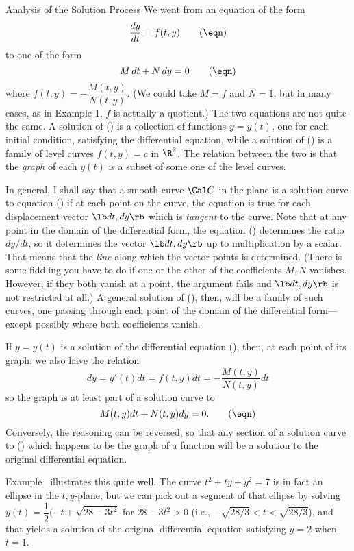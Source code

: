 \subhead Analysis of the Solution Process \endsubhead
We went from an equation of the form
\nexteqn
\xdef\EqA{\eqn}
$$
\frac{dy}{dt} = f(t,y)\tag\eqn
$$
to one of the form
\nexteqn
$$
M\,dt + N\,dy = 0\tag\eqn
$$
where $f(t,y) = -\dfrac{M(t,y)}{N(t,y)}$.  (We could take $M = f$
and $N = 1$, but in many cases, as in Example 1, $f$ is actually
a quotient.)  
The two equations are not quite the same.  A solution of (\EqA)
is a collection of functions $y = y(t)$,
one for each initial condition,  satisfying the differential equation,
while a solution of (\eqn) is a family of level curves
$f(t,y) = c$ in $\R^2$.  The relation between the two is
that the {\it graph\/} of each $y(t)$ is a subset of
some one of the level curves.

In general, I shall say that a smooth curve $\Cal C$
 in the plane is a
solution curve to equation (\eqn) if at each point on the
curve, the equation is true for each displacement vector
$\lb dt, dy \rb$ which is {\it tangent\/} to the curve.  Note that at
 any point in the domain of the differential form, the equation
(\eqn) determines the ratio $dy/dt$, so it
determines the vector  $\lb dt, dy \rb$
 up to multiplication by a scalar.  That means that the
{\it line\/} along which the vector  points is determined.  
(There is some fiddling you
have to do if one or the other of the coefficients $M, N$
vanishes.  However, if they both vanish at a point, the argument
fails and $\lb dt, dy \rb$ is not restricted at all.)    
A general solution of (\eqn), then, will be a
 family of such curves, one passing through each
point of the domain of the differential form---except possibly
where both coefficients vanish. 

If $y = y(t)$ is a solution of the differential equation (\EqA),
then,  at each point of its graph, we also
have the relation
$$
 dy = y'(t) dt = f(t,y) dt = -\frac{M(t,y)}{N(t,y)} dt
$$
so the graph is at least part of a solution curve to
$$
 M(t,y)dt + N(t,y)dy = 0.\tag\eqn
$$ 
Conversely, the reasoning can be reversed, so that any
section of a solution curve to (\eqn) which happens to be
the graph of a function will be a solution to the original
differential equation.

Example \en\ illustrates this quite well.  The curve
$t^2 + ty + y^2 = 7$ is in fact an ellipse in the $t,y$-plane,
but we can pick out a segment of that ellipse
by solving  $y(t) = \dfrac 12(-t + \sqrt{28 - 3t^2}$ 
 for $28 - 3t^2 > 0$ (i.e., $-\sqrt{28/3} < t < \sqrt{28/3}$),
and that yields a solution of the original differential
equation satisfying $y = 2$ when $t = 1$.

